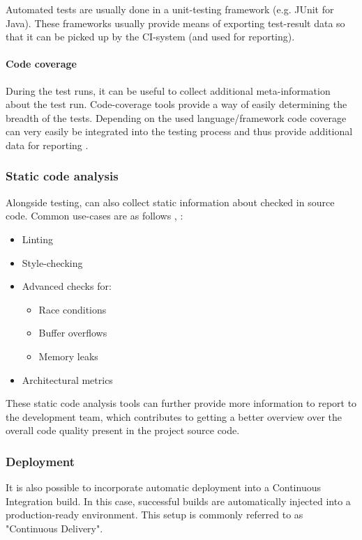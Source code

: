 Automated tests are usually done in a unit-testing framework (e.g. JUnit for
Java). These frameworks usually provide means of exporting test-result data so
that it can be picked up by the CI-system (and used for reporting).

\paragraph{Code coverage}
During the test runs, it can be useful to collect
additional meta-information about the test run. Code-coverage tools provide a
way of easily determining the breadth of the tests. Depending on the used
language/framework code coverage can very easily be integrated into the testing
process and thus provide additional data for reporting \cite{kajo-mece:2012}.

\subsubsection{Static code analysis}\label{sec:static-code-analysis}

Alongside testing, can also collect static information about checked in source
code. Common use-cases are as follows \cite{bommer:2008}, \cite{sneed:2010}:

\begin{itemize}
    \item Linting
    \item Style-checking
    \item Advanced checks for:
    \begin{itemize}
        \item Race conditions
        \item Buffer overflows
        \item Memory leaks
    \end{itemize}
    \item Architectural metrics
\end{itemize}

These static code analysis tools can further provide more information to report
to the development team, which contributes to getting a better overview over the
overall code quality present in the project source code.

\subsubsection{Deployment}\label{sec:deployment}

It is also possible to incorporate automatic deployment into a Continuous
Integration build. In this case, successful builds are automatically injected
into a production-ready environment. This setup is commonly referred to as
"Continuous Delivery".

